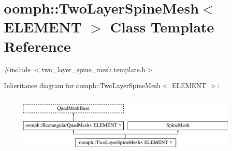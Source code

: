\hypertarget{classoomph_1_1TwoLayerSpineMesh}{}\section{oomph\+:\+:Two\+Layer\+Spine\+Mesh$<$ E\+L\+E\+M\+E\+NT $>$ Class Template Reference}
\label{classoomph_1_1TwoLayerSpineMesh}


{\ttfamily \#include $<$two\+\_\+layer\+\_\+spine\+\_\+mesh.\+template.\+h$>$}

Inheritance diagram for oomph\+:\+:Two\+Layer\+Spine\+Mesh$<$ E\+L\+E\+M\+E\+NT $>$\+:\begin{figure}[H]
\begin{center}
\leavevmode
\includegraphics[height=3.000000cm]{classoomph_1_1TwoLayerSpineMesh}
\end{center}
\end{figure}
